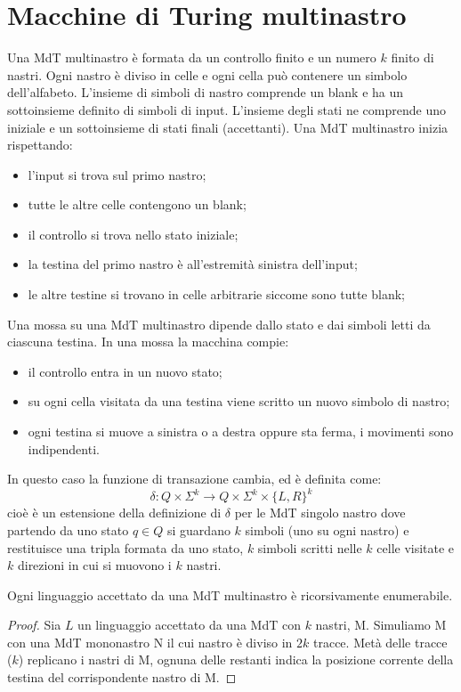 \section{Macchine di Turing multinastro}
Una MdT multinastro è formata da un controllo finito e un numero $k$ finito di nastri. 
Ogni nastro è diviso in celle e ogni cella può contenere un simbolo dell'alfabeto.
L'insieme di simboli di nastro comprende un blank e ha un sottoinsieme definito di simboli di input. 
L'insieme degli stati ne comprende uno iniziale e un sottoinsieme di stati finali (accettanti). 
Una MdT multinastro inizia rispettando:
\begin{itemize}
    \item l'input si trova sul primo nastro; 
    \item tutte le altre celle contengono un blank; 
    \item il controllo si trova nello stato iniziale; 
    \item la testina del primo nastro è all'estremità sinistra dell'input; 
    \item le altre testine si trovano in celle arbitrarie siccome sono tutte blank; 
\end{itemize}

Una mossa su una MdT multinastro dipende dallo stato e dai simboli letti da ciascuna testina. 
In una mossa la macchina compie: 
\begin{itemize}
    \item il controllo entra in un nuovo stato; 
    \item su ogni cella visitata da una testina viene scritto un nuovo simbolo di nastro; 
    \item ogni testina si muove a sinistra o a destra oppure sta ferma, i movimenti sono indipendenti.
\end{itemize}

In questo caso la funzione di transazione cambia, ed è definita come: 
$$
\delta : Q \times \Sigma^k \rightarrow Q \times \Sigma^k \times \{L,R\}^k
$$
cioè è un estensione della definizione di $\delta$ per le MdT singolo nastro dove partendo da uno stato $q \in Q$ si guardano $k$ simboli (uno su ogni nastro) e restituisce una tripla formata da uno stato, $k$ simboli scritti nelle $k$ celle visitate e $k$ direzioni in cui si muovono i $k$ nastri.

\begin{theorem}
    Ogni linguaggio accettato da una MdT multinastro è ricorsivamente enumerabile.
\end{theorem}
\begin{proof}
    Sia $L$ un linguaggio accettato da una MdT con $k$ nastri, M. Simuliamo M con una MdT mononastro N il cui nastro è diviso in $2k$ tracce. 
    Metà delle tracce ($k$) replicano i nastri di M, ognuna delle restanti indica la posizione corrente della testina del corrispondente nastro di M.
\end{proof}

